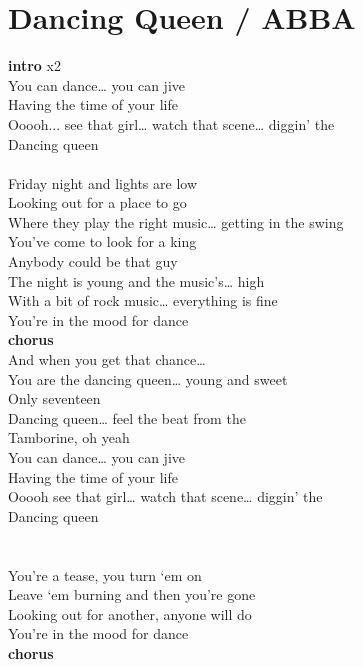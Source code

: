 \section{Dancing Queen / ABBA}\label{sec:dancingqueen}

\Gmajor
\BmajorSeven
\Eminor
\Aseven
\Cmajor
\DmajorEasy
\Aminor
\Bseven


\textbf{intro}     x2\\
You can dance… you can jive\\
Having the time of your life\\
Ooooh... see that girl… watch that scene… diggin’ the\\
Dancing queen \\
\\
Friday night and lights are low \\
Looking out for a place to go\\
Where they play the right music… getting in the swing\\
You’ve come to look for a king  \\
Anybody could be that guy\\
The night is young and the music’s… high\\
With a bit of rock music… everything is fine\\
You’re in the mood for dance  \\
\textbf{chorus}\\
And when you get that chance… \\
You are the dancing queen… young and sweet\\
Only seventeen \\
Dancing queen… feel the beat from the\\
Tamborine, oh yeah \\
You can dance… you can jive\\
Having the time of your life\\
Ooooh see that girl… watch that scene… diggin’ the\\
Dancing queen \\
 \\
 \\
You’re a tease, you turn ‘em on \\
Leave ‘em burning and then you’re  gone\\
Looking out for another, anyone will do\\
You’re in the mood for dance  \\
\textbf{chorus}
